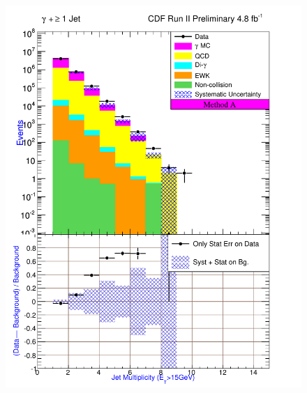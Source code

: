 \begin{figure}[h!]
{\includegraphics[keepaspectratio=true, scale=\resultsHistScale]{G30Jets_MtdA_plot1_NJet.pdf}\label{fig:pjSetTwo:NJet}}

\end{figure}
